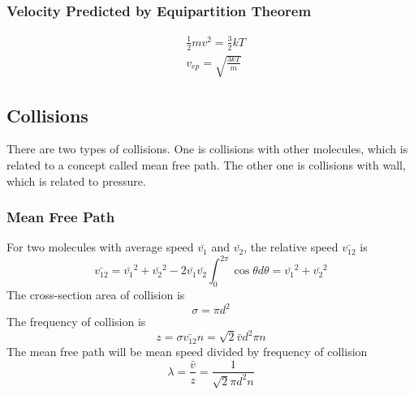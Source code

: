 \documentclass[letterpaper]{article}
\begin{document}
\subsubsection*{Velocity Predicted by Equipartition Theorem}
\begin{equation*}
    \begin{aligned}
         & \frac{1}{2}mv^2=\frac{3}{2}kT \\
         & v_{ep}=\sqrt{\frac{3kT}{m}}
    \end{aligned}
\end{equation*}
\subsection*{Collisions}
There are two types of collisions. One is collisions with other molecules, which is related
to a concept called mean free path. The other one is collisions with wall, which is related
to pressure.
\subsubsection*{Mean Free Path}
For two molecules with average speed $\bar{v_1}$ and $\bar{v_2}$, the relative speed $\bar{v_{12}}$ is
\begin{equation*}
    \bar{v_{12}}=\bar{v_1}^2+\bar{v_2}^2-2\bar{v_1}\bar{v_2}\int_0^{2\pi}\cos\theta d\theta=\bar{v_1}^2+\bar{v_2}^2
\end{equation*}
The cross-section area of collision is
\begin{equation*}
    \sigma=\pi d^2
\end{equation*}
The frequency of collision is
\begin{equation*}
    z=\sigma\bar{v_{12}}n=\sqrt{2}\bar{v}d^2\pi n
\end{equation*}
The mean free path will be mean speed divided by frequency of collision
\begin{equation*}
    \lambda=\frac{\bar{v}}{z}=\frac{1}{\sqrt{2}\pi d^2n}
\end{equation*}
\end{document}
